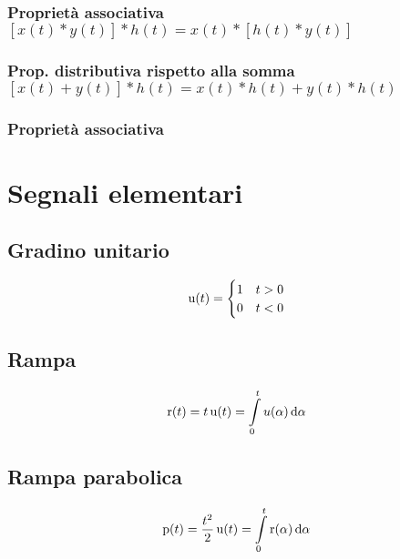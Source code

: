 \subsubsection{Proprietà associativa $[x(t)\ast y(t)]\ast h(t)= x(t)\ast [h(t)\ast y(t)]$}
\subsubsection{Prop. distributiva rispetto alla somma $[x(t)+y(t)]\ast h(t)= x(t)\ast h(t)+y(t)\ast h(t)$}
\subsubsection{Proprietà associativa}

\section{Segnali elementari}
\subsection{Gradino unitario}
\begin{equation}
\operatorname{u}(t)=\begin{cases}
1 & t>0 \\
0 & t<0
\end{cases}
\end{equation}
\subsection{Rampa}
\begin{equation}
\operatorname{r}(t)=t\operatorname{u}(t)=\int\limits_{0}^{t}{u(\alpha)}{\,\mathop{}\!\mathrm{d}{\alpha}}
\end{equation}
\subsection{Rampa parabolica}
\begin{equation} \operatorname{p}(t)=\frac{t^2}{2}\operatorname{u}(t)=\int\limits_{0}^{t}{\operatorname{r}(\alpha)}{\,\mathop{}\!\mathrm{d}{\alpha}}
\end{equation}

